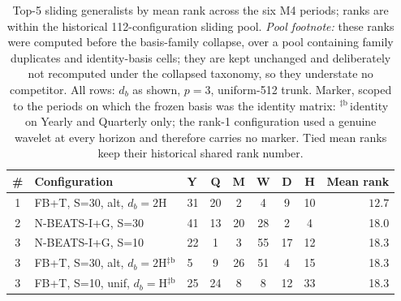 
\begin{table}[h]
  \centering
  \scriptsize
  \setlength{\tabcolsep}{3pt}
  \caption{Top-5 sliding generalists by mean rank across the six M4
  periods; ranks are within the historical 112-configuration sliding pool.
  \emph{Pool footnote:} these ranks were computed before the basis-family
  collapse, over a pool containing family duplicates and identity-basis
  cells; they are kept unchanged and deliberately not recomputed under the
  collapsed taxonomy, so they understate no competitor. All rows:
  $d_b$ as shown, $p = 3$, uniform-512 trunk. Marker, scoped to the
  periods on which the frozen basis was the identity matrix:
  $^{\ddag\mathrm{b}}$\,identity on Yearly and Quarterly only; the
  rank-1 configuration used a genuine wavelet at every horizon and
  therefore carries no marker. Tied mean ranks keep their historical
  shared rank number.}
  \label{tab:generalist_sliding}
  \begin{tabular}{@{}cllcccccr@{}}
    \toprule
    \# & Configuration & Y & Q & M & W & D & H & Mean rank \\
    \midrule
    1 & FB+T, S=30, alt, $d_b{=}2$H                & 31 & 20 & 2  & 4  & 9  & 10 & $\mathbf{12.7}$ \\
    2 & N-BEATS-I+G, S=30                          & 41 & 13 & 20 & 28 & 2  & 4  & 18.0 \\
    3 & N-BEATS-I+G, S=10                          & 22 & 1  & 3  & 55 & 17 & 12 & 18.3 \\
    3 & FB+T, S=30, alt, $d_b{=}2$H$^{\ddag\mathrm{b}}$ & 5 & 9 & 26 & 51 & 4  & 15 & 18.3 \\
    3 & FB+T, S=10, unif, $d_b{=}$H$^{\ddag\mathrm{b}}$ & 25 & 24 & 8 & 8 & 12 & 33 & 18.3 \\
    \bottomrule
  \end{tabular}
\end{table}